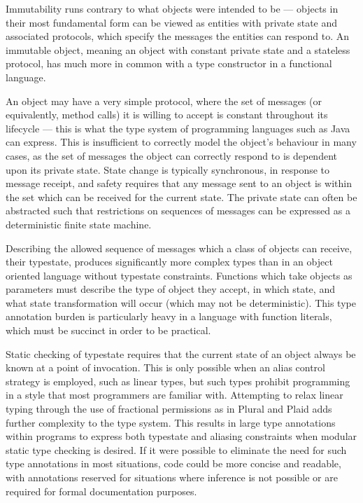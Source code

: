 \documentclass[preprint]{sigplanconf}
\begin{document}
Immutability runs contrary to what objects were intended to be --- objects in
their most fundamental form can be viewed as entities with private state and 
associated protocols, which specify the messages the entities can respond to.
An immutable object, meaning an object with constant private state and
a stateless protocol, has much more in common with a type constructor in 
a functional language.

An object may have a very simple 
protocol, where the set of messages (or equivalently, method calls) it is 
willing to accept is constant throughout its lifecycle --- this is what the 
type system of programming languages such as Java can express. This is
insufficient to correctly model the object's behaviour in many cases, as
the set of messages the object can correctly respond to is dependent upon
its private state. State change is typically synchronous, in 
response to message receipt, and safety requires that 
any message sent to an object is within the set which can be received for
the current state. The private state can often be abstracted
such that restrictions on sequences of messages can be expressed as a
deterministic finite state machine.

Describing the allowed sequence of messages which a class of objects can
receive, their typestate, produces significantly more complex types than
in an object oriented language without typestate constraints. Functions which
take objects as parameters must describe the type of object they accept,
in which state, and what state transformation will occur (which may not
be deterministic). This type annotation burden is particularly heavy
in a language with function literals, which must be succinct
in order to be practical.

Static checking of typestate requires
that the current state of an object always be known at a point of invocation.
This is only possible when an alias control strategy is employed, such as linear
types, but such types prohibit programming in a style that most programmers are 
familiar with. Attempting to relax linear typing through the use of fractional 
permissions as in Plural and Plaid \cite{Aldrich2009,Bierhoff2009}
adds further complexity to the type system. This results in 
large type annotations within programs to express both typestate and aliasing 
constraints when modular static type checking is desired.
If it were possible to eliminate the need for such type annotations in
most situations, code could be more concise and readable, with annotations
reserved for situations where inference is not possible or are required
for formal documentation purposes.
\end{document}
